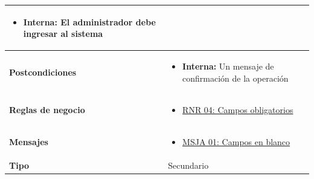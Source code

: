 \begin{center}
\begin{longtable}{| p{3.5cm} | p{11.5cm} |}
              \begin{itemize}
                \item \textbf{Interna:} El administrador debe ingresar al sistema
              \end{itemize} \\
        \hline  
          \textbf{Postcondiciones} &
              \begin{itemize}
                \item \textbf{Interna:} Un mensaje de confirmación de la operación
              \end{itemize} \\
        \hline
          \textbf{Reglas de negocio} &
              \begin{itemize}
                 \item {\hyperref[rnr_04]{RNR 04: Campos obligatorios}}
              \end{itemize} \\
        \hline
          \textbf{Mensajes} &
              \begin{itemize}
                 \item {\hyperref[msja_01]{MSJA 01: Campos en blanco}}
              \end{itemize} \\
        \hline
          \textbf{Tipo} & Secundario\\
        \hline      
  \end{longtable}
\end{center}
\endgroup

